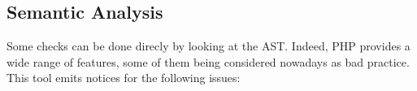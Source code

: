 \documentclass[a4paper]{article}
\begin{document}
%

\subsection{Semantic Analysis}
Some checks can be done direcly by looking at the AST. Indeed, PHP provides a
wide range of features, some of them being considered nowadays as bad practice.
This tool emits notices for the following issues:
\end{document}
